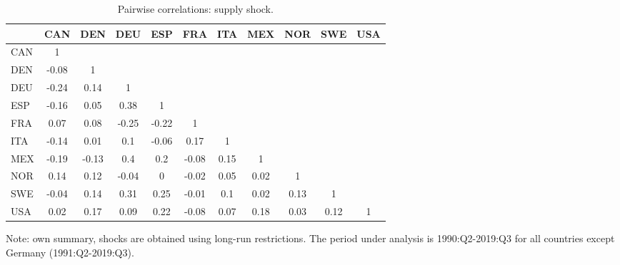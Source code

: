 \documentclass[12pt, a4paper]{article}
\begin{document}
\begin{table}[H]
\captionsetup{justification=raggedright,
singlelinecheck=false
}
    \centering
    \caption{Pairwise correlations: supply shock.}  
    \begin{tabular}{l ccc ccc ccc c}
    \toprule
 & CAN & DEN & DEU & ESP & FRA & ITA & MEX & NOR & SWE & USA \\ 
  \hline
  CAN & 1 &  &  &  &  &  &  &  &  &  \\ 
  DEN & -0.08 & 1 &  &  &  &  &  &  &  &  \\ 
  DEU & -0.24 & 0.14 & 1 &  &  &  &  &  &  &  \\ 
  ESP & -0.16 & 0.05 & 0.38 & 1 &  &  &  &  &  &  \\ 
  FRA & 0.07 & 0.08 & -0.25 & -0.22 & 1 &  &  &  &  &  \\ 
  ITA & -0.14 & 0.01 & 0.1 & -0.06 & 0.17 & 1 &  &  &  &  \\ 
  MEX & -0.19 & -0.13 & 0.4 & 0.2 & -0.08 & 0.15 & 1 &  &  &  \\ 
  NOR & 0.14 & 0.12 & -0.04 & 0 & -0.02 & 0.05 & 0.02 & 1 &  &  \\ 
  SWE & -0.04 & 0.14 & 0.31 & 0.25 & -0.01 & 0.1 & 0.02 & 0.13 & 1 &  \\ 
  USA & 0.02 & 0.17 & 0.09 & 0.22 & -0.08 & 0.07 & 0.18 & 0.03 & 0.12 & 1 \\ 
  \bottomrule
    \end{tabular}
    \begin{minipage}{\textwidth}
    \vspace{0.1cm} 
    \footnotesize Note: own summary, shocks are obtained using long-run restrictions. The period under analysis is 1990:Q2-2019:Q3 for all countries except Germany (1991:Q2-2019:Q3).
    \end{minipage}
    \label{table:a2}
\end{table}

\end{document}
